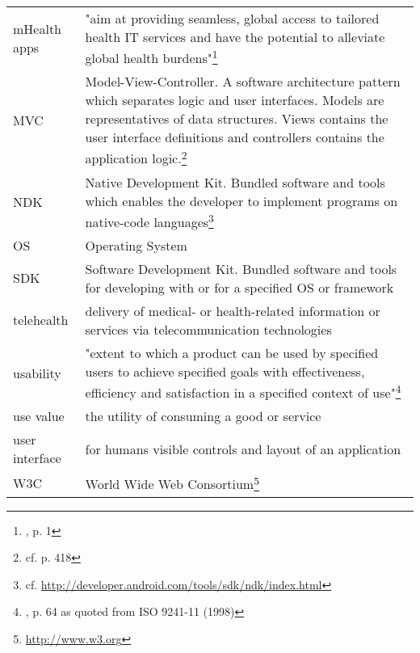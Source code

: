 \begin{longtable}{@{}p{}@{}p{}@{}}
    mHealth apps & "aim at providing seamless, global access to tailored health IT services and have the potential to alleviate global health burdens"\footnote{\cite{Dehling.2013}, p. 1} \\
    MVC & Model-View-Controller. A software architecture pattern which separates logic and user interfaces. Models are representatives of data structures. Views contains the user interface definitions and controllers contains the application logic.\footnote{cf. \cite{Hasan2011} p. 418} \\
    NDK & Native Development Kit. Bundled software and tools which enables the developer to implement programs on native-code languages\footnote{cf. \url{http://developer.android.com/tools/sdk/ndk/index.html}} \\
    OS & Operating System \\
    SDK & Software Development Kit. Bundled software and tools for developing with or for a specified OS or framework \\
    telehealth & delivery of medical- or health-related information or services via telecommunication technologies \\
    usability & "extent to which a product can be used by specified users to achieve specified goals with effectiveness, efficiency and satisfaction in a specified context of use"\footnote{\cite{Yeh.2012}, p. 64 as quoted from ISO 9241-11 (1998)} \\
    use value & the utility of consuming a good or service \\
    user interface & for humans visible controls and layout of an application \\
    W3C & World Wide Web Consortium\footnote{\url{http://www.w3.org}} \\
\end{longtable}